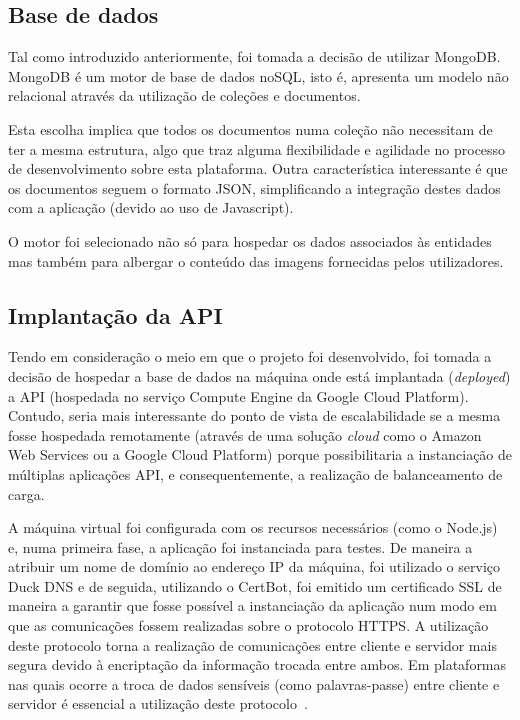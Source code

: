 \subsection{Base de dados}

Tal como introduzido anteriormente, foi tomada a decisão de utilizar MongoDB. MongoDB é um motor de base de dados noSQL, isto é, apresenta um modelo não relacional através da utilização de coleções e documentos.

\medskip \par

Esta escolha implica que todos os documentos numa coleção não necessitam de ter a mesma estrutura, algo que traz alguma flexibilidade e agilidade no processo de desenvolvimento sobre esta plataforma. Outra característica interessante é que os documentos seguem o formato JSON, simplificando a integração destes dados com a aplicação (devido ao uso de Javascript).

\medskip \par

O motor foi selecionado não só para hospedar os dados associados às entidades mas também para albergar o conteúdo das imagens fornecidas pelos utilizadores.

\subsection{Implantação da API}

Tendo em consideração o meio em que o projeto foi desenvolvido, foi tomada a decisão de hospedar a base de dados na máquina onde está implantada (\textit{deployed}) a API (hospedada no serviço Compute Engine da Google Cloud Platform). Contudo, seria mais interessante do ponto de vista de escalabilidade se a mesma fosse hospedada remotamente (através de uma solução \textit{cloud} como o Amazon Web Services ou a Google Cloud Platform) porque possibilitaria a instanciação de múltiplas aplicações API, e consequentemente, a realização de balanceamento de carga.

\medskip \par

A máquina virtual foi configurada com os recursos necessários (como o Node.js) e, numa primeira fase, a aplicação foi instanciada para testes. De maneira a atribuir um nome de domínio ao endereço IP da máquina, foi utilizado o serviço Duck DNS e de seguida, utilizando o CertBot, foi emitido um certificado SSL de maneira a garantir que fosse possível a instanciação da aplicação num modo em que as comunicações fossem realizadas sobre o protocolo HTTPS. A utilização deste protocolo torna a realização de comunicações entre cliente e servidor mais segura devido à encriptação da informação trocada entre ambos. Em plataformas nas quais ocorre a troca de dados sensíveis (como palavras-passe) entre cliente e servidor é essencial a utilização deste protocolo~\cite{Cloudflare2020}.






